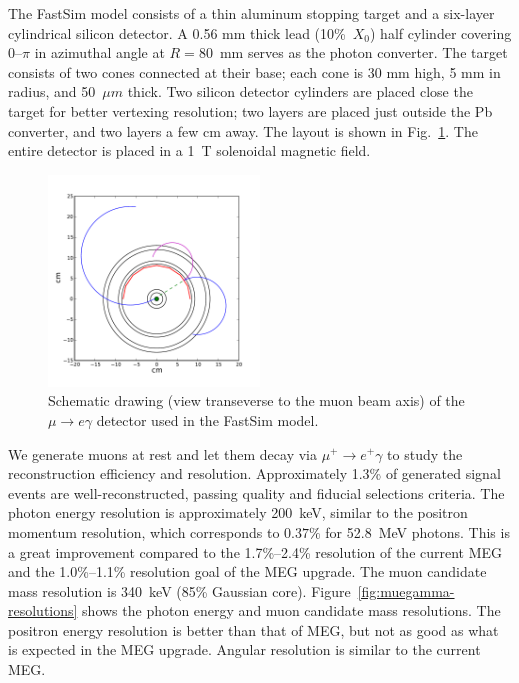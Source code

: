 The FastSim model consists of a thin aluminum stopping target and a six-layer
cylindrical silicon detector. A 0.56 mm thick lead (10\%~$X_0$) half cylinder
covering 0--$\pi$ in azimuthal angle at $R=80$~mm serves as the photon converter. 
The target consists of two cones connected at their base; each cone is 30 mm 
high, 5 mm in radius, and 50~$\mu m$ thick.
Two silicon detector cylinders are placed close the target for better vertexing resolution;
two layers are placed just outside the Pb converter, and two layers a few cm away. The layout is shown in
Fig.~\ref{fig:muegamma-scheme}. The entire detector is placed in a 1~T
solenoidal magnetic field. 

\begin{figure}[htbp]
   \centering
   \includegraphics[width=0.5\textwidth]{ChargedLeptons/Figures/muegamma-schematic.pdf} 
   \caption{Schematic drawing (view transeverse to the muon beam axis) of the $\mu\to e\gamma$ detector used in the 
   FastSim model. }
   \label{fig:muegamma-scheme}
\end{figure}

We generate muons at rest and let them decay via $\mu^+\to e^+\gamma$ to study
the reconstruction efficiency and resolution. Approximately 1.3\% of generated
signal events are well-reconstructed, passing quality and fiducial selections criteria.
The photon energy resolution is approximately 200~keV, similar to the positron momentum
resolution, which corresponds to $0.37\%$ for 52.8~MeV photons. This is a great
improvement compared to the 1.7\%--2.4\% resolution of the current MEG and the  1.0\%--1.1\% resolution goal of the MEG
upgrade. The muon candidate mass resolution is 340~keV (85\% Gaussian core).
Figure~\ref{fig:muegamma-resolutions} shows the photon energy and muon candidate 
mass resolutions. The positron energy resolution is better than that of MEG, but not
as good as what is expected in the MEG upgrade. Angular resolution is similar to  the
current MEG.

